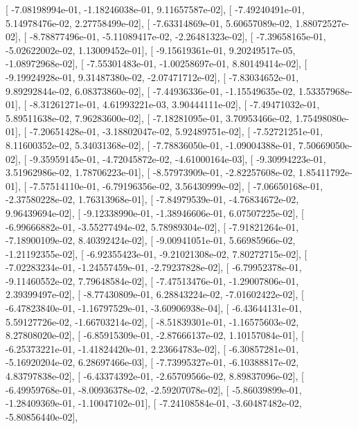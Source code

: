 \documentclass{article}
\begin{document}
       [ -7.08198994e-01,  -1.18246038e-01,   9.11657587e-02],
       [ -7.49240491e-01,   5.14978476e-02,   2.27758499e-02],
       [ -7.63314869e-01,   5.60657089e-02,   1.88072527e-02],
       [ -8.78877496e-01,  -5.11089417e-02,  -2.26481323e-02],
       [ -7.39658165e-01,  -5.02622002e-02,   1.13009452e-01],
       [ -9.15619361e-01,   9.20249517e-05,  -1.08972968e-02],
       [ -7.55301483e-01,  -1.00258697e-01,   8.80149414e-02],
       [ -9.19924928e-01,   9.31487380e-02,  -2.07471712e-02],
       [ -7.83034652e-01,   9.89292844e-02,   6.08373860e-02],
       [ -7.44936336e-01,  -1.15549635e-02,   1.53357968e-01],
       [ -8.31261271e-01,   4.61993221e-03,   3.90444111e-02],
       [ -7.49471032e-01,   5.89511638e-02,   7.96283600e-02],
       [ -7.18281095e-01,   3.70953466e-02,   1.75498080e-01],
       [ -7.20651428e-01,  -3.18802047e-02,   5.92489751e-02],
       [ -7.52721251e-01,   8.11600352e-02,   5.34031368e-02],
       [ -7.78836050e-01,  -1.09004388e-01,   7.50669050e-02],
       [ -9.35959145e-01,  -4.72045872e-02,  -4.61000164e-03],
       [ -9.30994223e-01,   3.51962986e-02,   1.78706223e-01],
       [ -8.57973909e-01,  -2.82257608e-02,   1.85411792e-01],
       [ -7.57514110e-01,  -6.79196356e-02,   3.56430999e-02],
       [ -7.06650168e-01,  -2.37580228e-02,   1.76313968e-01],
       [ -7.84979539e-01,  -4.76834672e-02,   9.96439694e-02],
       [ -9.12338990e-01,  -1.38946606e-01,   6.07507225e-02],
       [ -6.99666882e-01,  -3.55277494e-02,   5.78989304e-02],
       [ -7.91821264e-01,  -7.18900109e-02,   8.40392424e-02],
       [ -9.00941051e-01,   5.66985966e-02,  -1.21192355e-02],
       [ -6.92355423e-01,  -9.21021308e-02,   7.80272715e-02],
       [ -7.02283234e-01,  -1.24557459e-01,  -2.79237828e-02],
       [ -6.79952378e-01,  -9.11460552e-02,   7.79648584e-02],
       [ -7.47513476e-01,  -1.29007806e-01,   2.39399497e-02],
       [ -8.77430809e-01,   6.28843224e-02,  -7.01602422e-02],
       [ -6.47823840e-01,  -1.16797529e-01,  -3.60906938e-04],
       [ -6.43644131e-01,   5.59127726e-02,  -1.66703214e-02],
       [ -8.51839301e-01,  -1.16575603e-02,   8.27808020e-02],
       [ -6.85915309e-01,  -2.87666137e-02,   1.10157084e-01],
       [ -6.25373221e-01,  -1.41824420e-01,   2.23664783e-02],
       [ -6.30857281e-01,  -5.16920204e-02,   6.28697466e-03],
       [ -7.73995327e-01,  -6.10388817e-02,   4.83797838e-02],
       [ -6.43374392e-01,  -2.65709566e-02,   8.89837096e-02],
       [ -6.49959768e-01,  -8.00936378e-02,  -2.59207078e-02],
       [ -5.86039899e-01,  -1.28409369e-01,  -1.10047102e-01],
       [ -7.24108584e-01,  -3.60487482e-02,  -5.80856440e-02],
\end{document}
